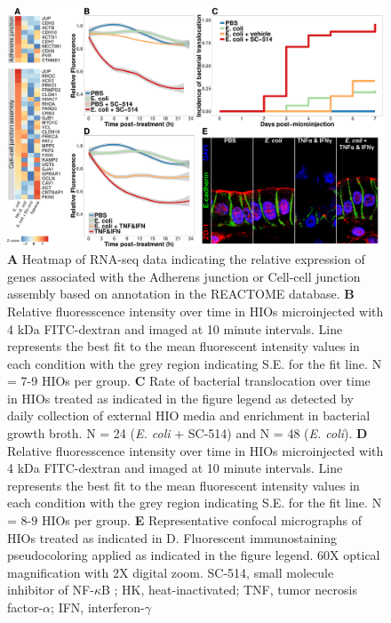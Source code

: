 \documentclass[9pt,lineo]{elife}
\begin{document}
\begin{figure}
\begin{fullwidth}
\centering
\includegraphics[width=0.95\linewidth]{./figures/figure8/figure8_multipanel.pdf}
\caption{\textbf{A} Heatmap of RNA-seq data indicating the relative expression of genes associated with the Adherens junction or Cell-cell junction assembly based on annotation in the REACTOME database. \textbf{B} Relative fluoresscence intensity over time in HIOs microinjected with 4 kDa FITC-dextran and imaged at 10 minute intervals. Line represents the best fit to the mean fluorescent intensity values in each condition with the grey region indicating S.E. for the fit line. N = 7-9 HIOs per group. \textbf{C} Rate of bacterial translocation over time in HIOs treated as indicated in the figure legend as detected by daily collection of external HIO media and enrichment in bacterial growth broth. N = 24 (\textit{E. coli} + SC-514) and N = 48 (\textit{E. coli}). \textbf{D} Relative fluoresscence intensity over time in HIOs microinjected with 4 kDa FITC-dextran and imaged at 10 minute intervals. Line represents the best fit to the mean fluorescent intensity values in each condition with the grey region indicating S.E. for the fit line. N = 8-9 HIOs per group. \textbf{E} Representative confocal micrographs of HIOs treated as indicated in D. Fluorescent immunostaining pseudocoloring applied as indicated in the figure legend. 60X optical magnification with 2X digital zoom. SC-514, small molecule inhibitor of NF-$\kappa$B ; HK, heat-inactivated; TNF, tumor necrosis factor-$\alpha$; IFN, interferon-$\gamma$}
\label{fig:fullwidth}
\end{fullwidth}
\end{figure}
\end{document}
